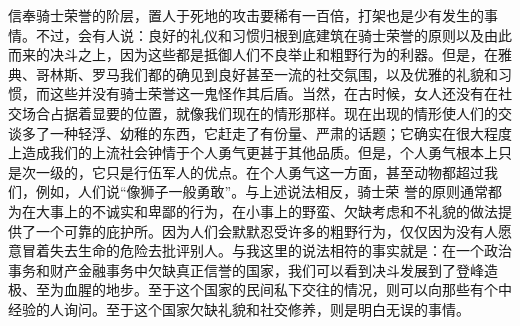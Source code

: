 \documentclass[12pt,oneside]{book}
\begin{document}
信奉骑士荣誉的阶层，置人于死地的攻击要稀有一百倍，打架也是少有发生的事情。不过，会有人说：良好的礼仪和习惯归根到底建筑在骑士荣誉的原则以及由此而来的决斗之上，因为这些都是抵御人们不良举止和粗野行为的利器。但是，在雅典、哥林斯、罗马我们都的确见到良好甚至一流的社交氛围，以及优雅的礼貌和习惯，而这些并没有骑士荣誉这一鬼怪作其后盾。当然，在古时候，女人还没有在社交场合占据着显要的位置，就像我们现在的情形那样。现在出现的情形使人们的交谈多了一种轻浮、幼稚的东西，它赶走了有份量、严肃的话题；它确实在很大程度上造成我们的上流社会钟情于个人勇气更甚于其他品质。但是，个人勇气根本上只是次一级的，它只是行伍军人的优点。在个人勇气这一方面，甚至动物都超过我们，例如，人们说“像狮子一般勇敢”。与上述说法相反，骑士荣
誉的原则通常都为在大事上的不诚实和卑鄙的行为，在小事上的野蛮、欠缺考虑和不礼貌的做法提供了一个可靠的庇护所。因为人们会默默忍受许多的粗野行为，仅仅因为没有人愿意冒着失去生命的危险去批评别人。与我这里的说法相符的事实就是：在一个政治事务和财产金融事务中欠缺真正信誉的国家，我们可以看到决斗发展到了登峰造极、至为血腥的地步。至于这个国家的民间私下交往的情况，则可以向那些有个中经验的人询问。至于这个国家欠缺礼貌和社交修养，则是明白无误的事情。 
\end{document}
